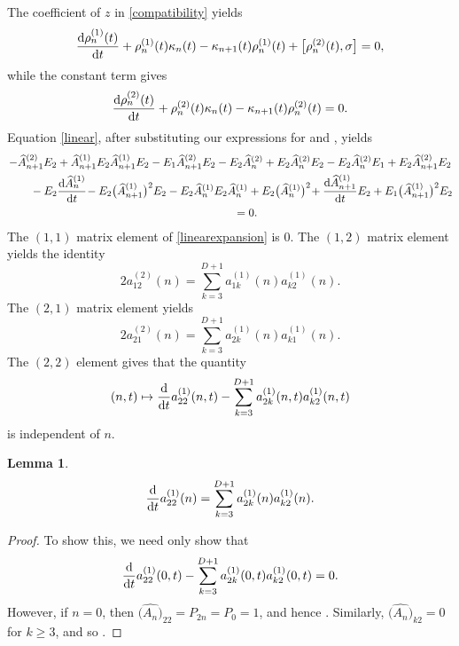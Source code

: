 \documentclass[pdftex]{sigma}
\numberwithin{equation}{section}
\newtheorem{Lemma}[Theorem]{Lemma}
\begin{document}
The coefficient of $z$ in \eqref{compatibility} yields
\begin{align}\label{linear}
\frac{{\rm d}\rho_n^{(1)}(t)}{{\rm d}t} + \rho_n^{(1)}(t) \kappa_n(t) - \kappa_{n+1}(t) \rho_n^{(1)}(t) + \big[\rho_n^{(2)}(t),\sigma\big] = 0,
\end{align}
while the constant term gives
\begin{align}\label{constant}
\frac{{\rm d} \rho_n^{(2)}(t)}{{\rm d}t}+\rho_n^{(2)}(t)\kappa_n(t)-\kappa_{n+1}(t) \rho_n^{(2)}(t)=0.
\end{align}
Equation \eqref{linear}, after substituting our expressions for  and , yields
\begin{gather}
-\widehat{A}^{(2)}_{n+1} E_2 + \widehat{A}^{(1)}_{n+1} E_2 \widehat{A}^{(1)}_{n+1} E_2 - E_1 \widehat{A}^{(2)}_{n+1} E_2 - E_2 \widehat{A}^{(2)}_n + E_2 \widehat{A}^{(2)}_n E_2 - E_2 \widehat{A}^{(2)}_n E_1+E_2 \widehat{A}^{(2)}_{n+1} E_2\nonumber \\
\qquad{} - E_2 \frac{{\rm d} \widehat{A}^{(1)}_n}{{\rm d}t}\! - E_2 \big(\widehat{A}^{(1)}_{n + 1}\big)^2 E_2
-E_2 \widehat{A}^{(1)}_{n} E_2 \widehat{A}^{(1)}_n + E_2 \big(\widehat{A}^{(1)}_n\big)^2\! + \frac{{\rm d} \widehat{A}^{(1)}_{n+1}}{{\rm d}t} E_2 + E_1 \big(\widehat{A}^{(1)}_{n+1}\big)^2 E_2\nonumber\\
\quad\qquad= 0.\label{linearexpansion}
\end{gather}
The $(1,1)$ matrix element of \eqref{linearexpansion} is $0$. The $(1,2)$ matrix element yields the identity
\begin{equation}\label{identity1}
2 a_{12}^{(2)} (n) =\sum_{k=3}^{D+1} a_{1k}^{(1)} (n) a_{k2}^{(1)}(n).
\end{equation}
The $(2,1)$ matrix element yields
\begin{equation}\label{identity2}
2 a_{21}^{(2)} (n) =\sum_{k=3}^{D+1} a_{2k}^{(1)} (n) a_{k1}^{(1)}(n).
\end{equation}
The $(2,2)$ element gives that the quantity
\begin{equation*}
(n,t) \mapsto \frac{\rm d}{{\rm d}t}a_{22}^{(1)}(n,t) - \sum_{k=3}^{D+1} a_{2k}^{(1)}(n,t) a_{k2}^{(1)}(n,t)
\end{equation*}
is independent of $n$.
\begin{Lemma}\label{nequal0}
\begin{equation*}
\frac{\rm d}{{\rm d}t}a_{22}^{(1)}(n) = \sum_{k=3}^{D+1} a_{2k}^{(1)}(n) a_{k2}^{(1)}(n).
\end{equation*}
\end{Lemma}
\begin{proof}
To show this, we need only show that
\begin{equation*}
\frac{\rm d}{{\rm d}t}a_{22}^{(1)}(0,t) - \sum_{k=3}^{D+1} a_{2k}^{(1)}(0,t) a_{k2}^{(1)}(0,t) = 0.
\end{equation*}
However, if $n=0$, then $\big(\widehat{A_n}\big)_{22} = P_{2n} = P_0 = 1$, and hence . Similarly, $\big(\widehat{A_n}\big)_{k2} = 0$ for $k \geq 3$, and so .
\end{proof}
\end{document}
